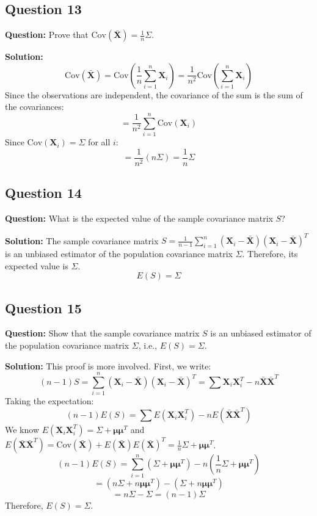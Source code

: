 \subsection*{Question 13}
\textbf{Question:} Prove that $\text{Cov}(\bar{\mathbf{X}}) = \frac{1}{n}\Sigma$.

\textbf{Solution:}
$$ \text{Cov}(\bar{\mathbf{X}}) = \text{Cov}\left(\frac{1}{n}\sum_{i=1}^n \mathbf{X}_i\right) = \frac{1}{n^2} \text{Cov}\left(\sum_{i=1}^n \mathbf{X}_i\right) $$
Since the observations are independent, the covariance of the sum is the sum of the covariances:
$$ = \frac{1}{n^2} \sum_{i=1}^n \text{Cov}(\mathbf{X}_i) $$
Since $\text{Cov}(\mathbf{X}_i) = \Sigma$ for all $i$:
$$ = \frac{1}{n^2} (n\Sigma) = \frac{1}{n}\Sigma $$

\subsection*{Question 14}
\textbf{Question:} What is the expected value of the sample covariance matrix $S$?

\textbf{Solution:}
The sample covariance matrix $S = \frac{1}{n-1} \sum_{i=1}^n (\mathbf{X}_i - \bar{\mathbf{X}})(\mathbf{X}_i - \bar{\mathbf{X}})^T$ is an unbiased estimator of the population covariance matrix $\Sigma$. Therefore, its expected value is $\Sigma$.
$$ E(S) = \Sigma $$

\subsection*{Question 15}
\textbf{Question:} Show that the sample covariance matrix $S$ is an unbiased estimator of the population covariance matrix $\Sigma$, i.e., $E(S) = \Sigma$.

\textbf{Solution:}
This proof is more involved. First, we write:
$$ (n-1)S = \sum_{i=1}^n (\mathbf{X}_i - \bar{\mathbf{X}})(\mathbf{X}_i - \bar{\mathbf{X}})^T = \sum \mathbf{X}_i\mathbf{X}_i^T - n\bar{\mathbf{X}}\bar{\mathbf{X}}^T $$
Taking the expectation:
$$ (n-1)E(S) = \sum E(\mathbf{X}_i\mathbf{X}_i^T) - nE(\bar{\mathbf{X}}\bar{\mathbf{X}}^T) $$
We know $E(\mathbf{X}_i\mathbf{X}_i^T) = \Sigma + \boldsymbol{\mu}\boldsymbol{\mu}^T$ and $E(\bar{\mathbf{X}}\bar{\mathbf{X}}^T) = \text{Cov}(\bar{\mathbf{X}}) + E(\bar{\mathbf{X}})E(\bar{\mathbf{X}})^T = \frac{1}{n}\Sigma + \boldsymbol{\mu}\boldsymbol{\mu}^T$.
$$ (n-1)E(S) = \sum_{i=1}^n (\Sigma + \boldsymbol{\mu}\boldsymbol{\mu}^T) - n(\frac{1}{n}\Sigma + \boldsymbol{\mu}\boldsymbol{\mu}^T) $$
$$ = (n\Sigma + n\boldsymbol{\mu}\boldsymbol{\mu}^T) - (\Sigma + n\boldsymbol{\mu}\boldsymbol{\mu}^T) $$
$$ = n\Sigma - \Sigma = (n-1)\Sigma $$
Therefore, $E(S) = \Sigma$.
